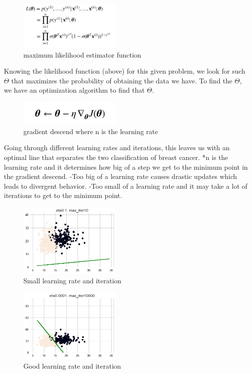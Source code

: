 \documentclass[conference]{IEEEtran}
\begin{document}
\begin{figure}[htbp]
\centerline{\includegraphics[width=50mm,scale=0.5]{imgs/max_like}}
\caption{maximum likelihood estimator function}
\label{fig}
\end{figure}
Knowing the likelihood function (above) for this given problem, we look for such $\Theta$ that maximizes the probability of obtaining the data we have. To find the $\Theta$, we have an optimization algorithm to find that $\Theta$.
\begin{figure}[htbp]
\centerline{\includegraphics[width=50mm,scale=0.5]{imgs/gradient}}
\caption{gradient descend where n is the learning rate }
\label{fig}
\end{figure}
\newpage
Going through different learning rates and iterations, this leaves us with an optimal line that separates the two classification of breast cancer. *n is the learning rate and it determines how big of a step we get to the minimum point in the gradient descend.  
\noindent-Too big of a learning rate causes drastic updates which leads to divergent behavior. 
\noindent-Too small of a learning rate and it may take a lot of iterations to get to the minimum point. 
\begin{figure}[htbp]
\centerline{\includegraphics[width=50mm,scale=0.5]{imgs/output_20_1.png}}
\caption{Small learning rate and iteration}
\label{fig}
\end{figure}
\begin{figure}[htbp]
\centerline{\includegraphics[width=50mm,scale=0.5]{imgs/output_20_16.png}}
\caption{Good learning rate and iteration}
\label{fig}
\end{figure}
\end{document}
